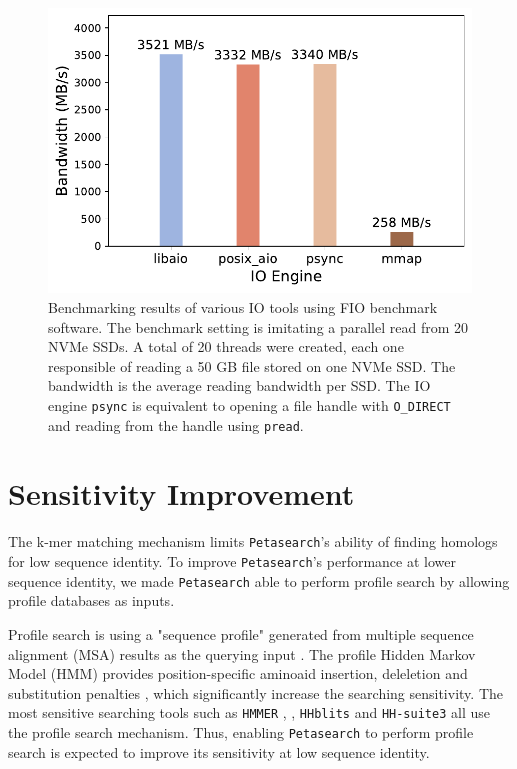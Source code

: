 \begin{figpage}
\begin{figure}[htbp]
    \label{fig:prot_seq_compress}
    \bigskip
    \centering
    \includegraphics[width=.65\textwidth]{images/fio_benchmark.pdf}
    \caption{Benchmarking results of various IO tools using FIO benchmark software.
      The benchmark setting is imitating a parallel read from 20 NVMe SSDs.
      A total of 20 threads were created, each one responsible of reading a 50 GB file stored on one NVMe SSD.
      The bandwidth is the average reading bandwidth per SSD.
      The IO engine \texttt{psync} is equivalent to opening a file handle with \texttt{O\_DIRECT} and reading from the handle using \texttt{pread}.}
    \label{fig:fio_benchmark}
  \end{figure}
\end{figpage}
\pagebreak

\section{Sensitivity Improvement} \label{section:sensitivity-improvement}

The k-mer matching mechanism limits \texttt{Petasearch}'s ability of finding homologs for low sequence identity.
To improve \texttt{Petasearch}'s performance at lower sequence identity, we made \texttt{Petasearch} able to perform profile search by allowing profile databases as inputs.

Profile search is using a "sequence profile" generated from multiple sequence alignment (MSA) results as the querying input \cite{steinegger2019hh}.
The profile Hidden Markov Model (HMM) provides position-specific aminoaid insertion, deleletion and substitution penalties \cite{steinegger2019hh}, which significantly increase the searching sensitivity.
The most sensitive searching tools such as \texttt{HMMER} \cite{eddy2009new}, \cite{eddy2011accelerated}, \texttt{HHblits} \cite{remmert2012hhblits} and \texttt{HH-suite3} \cite{steinegger2019hh} all use the profile search mechanism.
Thus, enabling \texttt{Petasearch} to perform profile search is expected to improve its sensitivity at low sequence identity.

